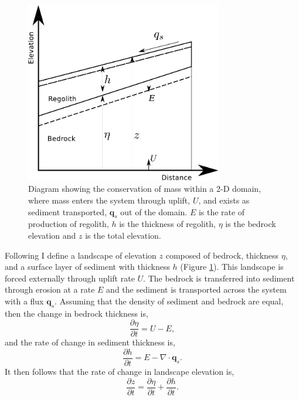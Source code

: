 \begin{subappendices}
\begin{figure}
\centering
\includegraphics[width=8.6cm]{./figures/ch2-erosion-diagram.pdf}
\caption{Diagram showing the conservation of mass within a 2-D domain, where mass enters the system through uplift, $U$, and exists as sediment transported, $\mathbf{q}_{s}$ out of the domain. $E$ is the rate of production of regolith, $h$ is the thickness of regolith, $\eta$ is the bedrock elevation and $z$ is the total elevation.}
\label{fg:1dmodel}
\end{figure}

Following \cite{dietrich-etal-2003} I define a landscape of elevation $z$ composed of bedrock, thickness $\eta$, and a surface layer of sediment with thickness $h$ (Figure \ref{fg:1dmodel}). This landscape is forced externally through uplift rate $U$. The bedrock is transferred into sediment through erosion at a rate $E$ and the sediment is transported across the system with a flux $\mathbf{q}_{s}$. Assuming that the density of sediment and bedrock are equal, then the change in bedrock thickness is,
\begin{equation}
\frac{\partial\eta}{\partial t} = U - E,
\label{eq:bedrock}
\end{equation}
and the rate of change in sediment thickness is,
\begin{equation}
\frac{\partial h}{\partial t} = E - \nabla \cdot \mathbf{q}_{s}.
\label{eq:sediment}
\end{equation}
It then follows that the rate of change in landscape elevation is,
\begin{equation}
\frac{\partial z}{\partial t} = \frac{\partial\eta}{\partial t} + \frac{\partial h}{\partial t}.
\label{eq:elevation}
\end{equation}


\end{subappendices}
